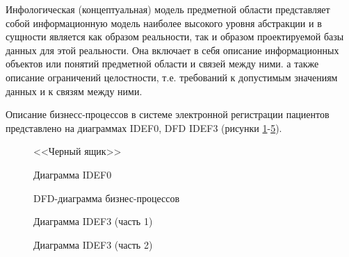 Инфологическая (концептуальная) модель предметной области представляет собой информационную модель наиболее высокого уровня абстракции и в сущности является как образом реальности, так и образом проектируемой базы данных для этой реальности. Она включает в себя описание информационных объектов или понятий предметной области и связей между ними. а также описание ограничений целостности, т.е. требований к допустимым значениям данных и к связям между ними.

Описание бизнесс-процессов в системе электронной регистрации пациентов представлено на диаграммах IDEF0, DFD IDEF3 (рисунки \ref{idef0_1:idef0_1}-\ref{idef3_2:idef3_2}).

\begin{figure}[h!]
\caption{<<Черный ящик>>}
\label{idef0_1:idef0_1}
\end{figure} 

\begin{figure}[h!]
\caption{Диаграмма IDEF0}
\label{idef0_2:idef0_2}
\end{figure} 

\begin{figure}[h!]
\caption{DFD-диаграмма бизнес-процессов}
\label{dfd:dfd}
\end{figure} 

\begin{figure}[h!]
\caption{Диаграмма IDEF3 (часть 1)}
\label{idef3_1:idef3_1}
\end{figure} 

\begin{figure}[h!]
\caption{Диаграмма IDEF3 (часть 2)}
\label{idef3_2:idef3_2}
\end{figure} 

\clearpage




